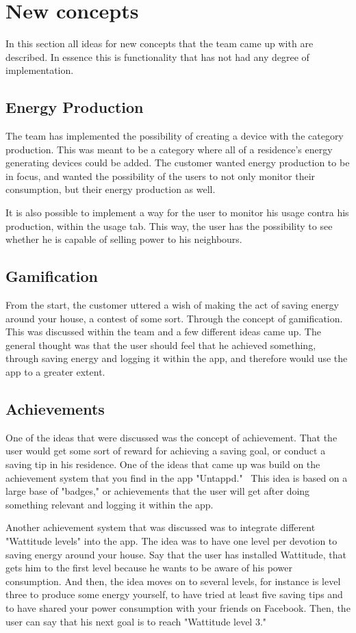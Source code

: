 \section{New concepts}
In this section all ideas for new concepts that the team came up with are described. In essence this is functionality that has not had any degree of implementation.

\subsection{Energy Production}
The team has implemented the possibility of creating a device with the category production. This was meant to be a category where all of a residence's energy generating devices could be added. The customer wanted energy production to be in focus, and wanted the possibility of the users to not only monitor their consumption, but their energy production as well. 

It is also possible to implement a way for the user to monitor his usage contra his production, within the usage tab. This way, the user has the possibility to see whether he is capable of selling power to his neighbours. 

\subsection{Gamification}
From the start, the customer uttered a wish of making the act of saving energy around your house, a contest of some sort. Through the concept of gamification. This was discussed within the team and a few different ideas came up. The general thought was that the user should feel that he achieved something, through saving energy and logging it within the app, and therefore would use the app to a greater extent. 

\subsection{Achievements}
One of the ideas that were discussed was the concept of achievement. That the user would get some sort of reward for achieving a saving goal, or conduct a saving tip in his residence. One of the ideas that came up was build on the achievement system that you find in the app "Untappd."~\cite{untappd}
This idea is based on a large base of "badges," or achievements that the user will get after doing something relevant and logging it within the app. 

Another achievement system that was discussed was to integrate different "Wattitude levels" into the app. The idea was to have one level per devotion to saving energy around your house. Say that the user has installed Wattitude, that gets him to the first level because he wants to be aware of his power consumption. And then, the idea moves on to several levels, for instance is level three to produce some energy yourself, to have tried at least five saving tips and to have shared your power consumption with your friends on Facebook. Then, the user can say that his next goal is to reach "Wattitude level 3."

